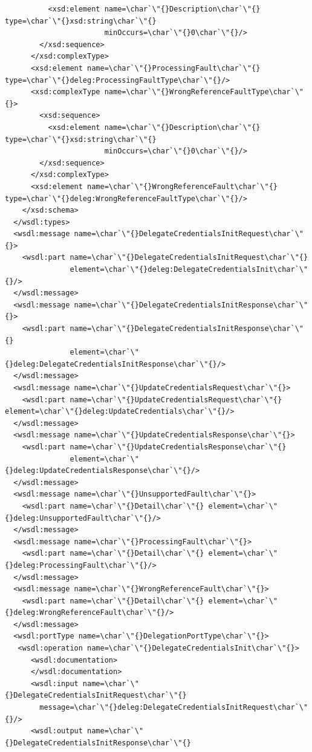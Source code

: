 \documentclass{article}                            %
\begin{document}
\begin{footnotesize}
\begin{verbatim}
          <xsd:element name=\char`\"{}Description\char`\"{} type=\char`\"{}xsd:string\char`\"{}
                       minOccurs=\char`\"{}0\char`\"{}/>
        </xsd:sequence>
      </xsd:complexType>
      <xsd:element name=\char`\"{}ProcessingFault\char`\"{} type=\char`\"{}deleg:ProcessingFaultType\char`\"{}/>
      <xsd:complexType name=\char`\"{}WrongReferenceFaultType\char`\"{}>
        <xsd:sequence>
          <xsd:element name=\char`\"{}Description\char`\"{} type=\char`\"{}xsd:string\char`\"{}
                       minOccurs=\char`\"{}0\char`\"{}/>
        </xsd:sequence>
      </xsd:complexType>
      <xsd:element name=\char`\"{}WrongReferenceFault\char`\"{} type=\char`\"{}deleg:WrongReferenceFaultType\char`\"{}/>
    </xsd:schema>
  </wsdl:types>
  <wsdl:message name=\char`\"{}DelegateCredentialsInitRequest\char`\"{}>
    <wsdl:part name=\char`\"{}DelegateCredentialsInitRequest\char`\"{}
               element=\char`\"{}deleg:DelegateCredentialsInit\char`\"{}/>
  </wsdl:message>
  <wsdl:message name=\char`\"{}DelegateCredentialsInitResponse\char`\"{}>
    <wsdl:part name=\char`\"{}DelegateCredentialsInitResponse\char`\"{}
               element=\char`\"{}deleg:DelegateCredentialsInitResponse\char`\"{}/>
  </wsdl:message>
  <wsdl:message name=\char`\"{}UpdateCredentialsRequest\char`\"{}>
    <wsdl:part name=\char`\"{}UpdateCredentialsRequest\char`\"{} element=\char`\"{}deleg:UpdateCredentials\char`\"{}/>
  </wsdl:message>
  <wsdl:message name=\char`\"{}UpdateCredentialsResponse\char`\"{}>
    <wsdl:part name=\char`\"{}UpdateCredentialsResponse\char`\"{}
               element=\char`\"{}deleg:UpdateCredentialsResponse\char`\"{}/>
  </wsdl:message>
  <wsdl:message name=\char`\"{}UnsupportedFault\char`\"{}>
    <wsdl:part name=\char`\"{}Detail\char`\"{} element=\char`\"{}deleg:UnsupportedFault\char`\"{}/>
  </wsdl:message>
  <wsdl:message name=\char`\"{}ProcessingFault\char`\"{}>
    <wsdl:part name=\char`\"{}Detail\char`\"{} element=\char`\"{}deleg:ProcessingFault\char`\"{}/>
  </wsdl:message>
  <wsdl:message name=\char`\"{}WrongReferenceFault\char`\"{}>
    <wsdl:part name=\char`\"{}Detail\char`\"{} element=\char`\"{}deleg:WrongReferenceFault\char`\"{}/>
  </wsdl:message>
  <wsdl:portType name=\char`\"{}DelegationPortType\char`\"{}>
   <wsdl:operation name=\char`\"{}DelegateCredentialsInit\char`\"{}>
      <wsdl:documentation>
      </wsdl:documentation>
      <wsdl:input name=\char`\"{}DelegateCredentialsInitRequest\char`\"{}
        message=\char`\"{}deleg:DelegateCredentialsInitRequest\char`\"{}/>
      <wsdl:output name=\char`\"{}DelegateCredentialsInitResponse\char`\"{}

\end{verbatim}
\end{footnotesize}
\end{document}
